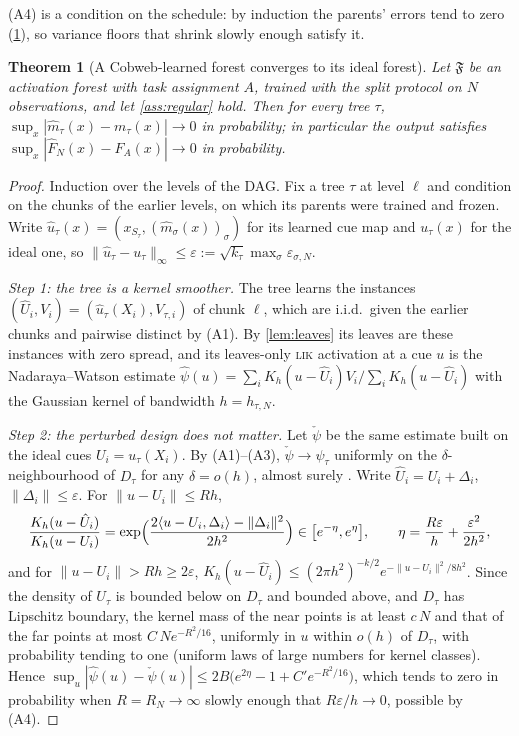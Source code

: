 \documentclass[11pt]{article}
\newtheorem{theorem}{Theorem}
\theoremstyle{definition}
\theoremstyle{remark}
\newcommand{\F}{\mathfrak{F}}
\begin{document}
(A4) is a condition on the schedule: by induction the parents' errors tend to zero
(\cref{thm:ideal}), so variance floors that shrink slowly enough satisfy it.

\begin{theorem}[A Cobweb-learned forest converges to its ideal forest]\label{thm:ideal}
Let $\F$ be an activation forest with task assignment $A$, trained with the split
protocol on $N$ observations, and let \cref{ass:regular} hold.  Then for every tree
$\tau$, $\sup_x|\hat m_\tau(x)-m_\tau(x)|\to0$ in probability; in particular the output
satisfies $\sup_x|\hat F_N(x)-F_A(x)|\to0$ in probability.
\end{theorem}
\begin{proof}
Induction over the levels of the DAG.  Fix a tree $\tau$ at level $\ell$ and condition on
the chunks of the earlier levels, on which its parents were trained and frozen.  Write
$\hat u_\tau(x)=(x_{S_\tau},(\hat m_\sigma(x))_\sigma)$ for its learned cue map and
$u_\tau(x)$ for the ideal one, so $\|\hat u_\tau-u_\tau\|_\infty\le\varepsilon:=
\sqrt{k_\tau}\max_\sigma\varepsilon_{\sigma,N}$.

\emph{Step 1: the tree is a kernel smoother.}  The tree learns the instances
$(\hat U_i,V_i)=(\hat u_\tau(X_i),V_{\tau,i})$ of chunk $\ell$, which are i.i.d.\ given
the earlier chunks and pairwise distinct by (A1).  By \cref{lem:leaves} its leaves are
these instances with zero spread, and its leaves-only \textsc{lik} activation at a cue
$u$ is the Nadaraya--Watson estimate
$\hat\psi(u)=\sum_iK_h(u-\hat U_i)V_i/\sum_iK_h(u-\hat U_i)$ with the Gaussian kernel of
bandwidth $h=h_{\tau,N}$.

\emph{Step 2: the perturbed design does not matter.}  Let $\check\psi$ be the same
estimate built on the ideal cues $U_i=u_\tau(X_i)$.  By (A1)--(A3), $\check\psi\to\psi_\tau$
uniformly on the $\delta$-neighbourhood of $D_\tau$ for any $\delta=o(h)$, almost surely
\citep{devroye1978,mack1982}.  Write $\hat U_i=U_i+\Delta_i$, $\|\Delta_i\|\le\varepsilon$.
For $\|u-U_i\|\le Rh$,
\[
  \frac{K_h(u-\hat U_i)}{K_h(u-U_i)}=\exp\Bigl(\frac{2\langle u-U_i,\Delta_i\rangle-\|\Delta_i\|^2}{2h^2}\Bigr)
  \in\bigl[e^{-\eta},e^{\eta}\bigr],\qquad \eta=\frac{R\varepsilon}{h}+\frac{\varepsilon^2}{2h^2},
\]
and for $\|u-U_i\|>Rh\ge2\varepsilon$, $K_h(u-\hat U_i)\le(2\pi h^2)^{-k/2}
e^{-\|u-U_i\|^2/8h^2}$.  Since the density of $U_\tau$ is bounded below on $D_\tau$ and
bounded above, and $D_\tau$ has Lipschitz boundary, the kernel mass of the near points
is at least $c\,N$ and that of the far points at most $C\,Ne^{-R^2/16}$, uniformly in $u$
within $o(h)$ of $D_\tau$, with probability tending to one (uniform laws of large numbers
for kernel classes).
Hence $\sup_u|\hat\psi(u)-\check\psi(u)|\le2B\bigl(e^{2\eta}-1+C'e^{-R^2/16}\bigr)$, which
tends to zero in probability when $R=R_N\to\infty$ slowly enough that
$R\varepsilon/h\to0$, possible by (A4).


\end{proof}
\end{document}
